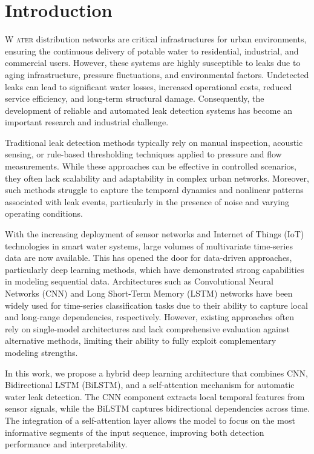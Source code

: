\section{Introduction}

\lettrine[lines=2]{\color{titleblue}W}{ ater} distribution networks are critical infrastructures for urban environments, ensuring the continuous delivery of potable water to residential, industrial, and commercial users. However, these systems are highly susceptible to leaks due to aging infrastructure, pressure fluctuations, and environmental factors. Undetected leaks can lead to significant water losses, increased operational costs, reduced service efficiency, and long-term structural damage. Consequently, the development of reliable and automated leak detection systems has become an important research and industrial challenge.

Traditional leak detection methods typically rely on manual inspection, acoustic sensing, or rule-based thresholding techniques applied to pressure and flow measurements. While these approaches can be effective in controlled scenarios, they often lack scalability and adaptability in complex urban networks. Moreover, such methods struggle to capture the temporal dynamics and nonlinear patterns associated with leak events, particularly in the presence of noise and varying operating conditions.

With the increasing deployment of sensor networks and Internet of Things (IoT) technologies in smart water systems, large volumes of multivariate time-series data are now available. This has opened the door for data-driven approaches, particularly deep learning methods, which have demonstrated strong capabilities in modeling sequential data. Architectures such as Convolutional Neural Networks (CNN) and Long Short-Term Memory (LSTM) networks have been widely used for time-series classification tasks due to their ability to capture local and long-range dependencies, respectively. However, existing approaches often rely on single-model architectures and lack comprehensive evaluation against alternative methods, limiting their ability to fully exploit complementary modeling strengths.

In this work, we propose a hybrid deep learning architecture that combines CNN, Bidirectional LSTM (BiLSTM), and a self-attention mechanism for automatic water leak detection. The CNN component extracts local temporal features from sensor signals, while the BiLSTM captures bidirectional dependencies across time. The integration of a self-attention layer allows the model to focus on the most informative segments of the input sequence, improving both detection performance and interpretability.

